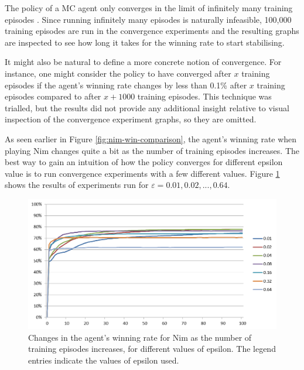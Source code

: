 \documentclass[11pt,a4paper]{report}
\begin{document}
The policy of a MC agent only converges in the limit of infinitely many training episodes \cite{rl-book}. Since running infinitely many episodes is naturally infeasible, 100,000 training episodes are run in the convergence experiments and the resulting graphs are inspected to see how long it takes for the winning rate to start stabilising.

It might also be natural to define a more concrete notion of convergence. For instance, one might consider the policy to have converged after $x$ training episodes if the agent's winning rate changes by less than 0.1\% after $x$ training episodes compared to after $x+1000$ training episodes. This technique was trialled, but the results did not provide any additional insight relative to visual inspection of the convergence experiment graphs, so they are omitted.

As seen earlier in Figure \ref{fig:nim-win-comparison}, the agent's winning rate when playing Nim changes quite a bit as the number of training episodes increases. The best way to gain an intuition of how the policy converges for different epsilon value is to run convergence experiments with a few different values. Figure \ref{nim-convergence-comparison} shows the results of experiments run for $\varepsilon = 0.01, 0.02,..., 0.64$.

\begin{figure}[htbp]
	\begin{center}
		\includegraphics[width=\linewidth]{Nim_PerformanceResults_Comparison_001_to_064.png}
		\caption{Changes in the agent's winning rate for Nim as the number of training episodes increases, for different values of epsilon. The legend entries indicate the values of epsilon used.}
		\label{nim-convergence-comparison}
	\end{center}
\end{figure}
\end{document}
